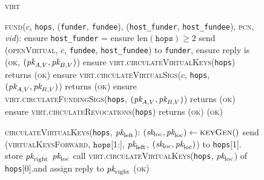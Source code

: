\begin{figure}[H]
  \begin{processbox}{\textsc{virt}}
    \begin{algorithmic}[1]
      \State \textsc{fund}($c$, \texttt{hops}, (\texttt{funder},
      \texttt{fundee}), (\texttt{host\_funder}, \texttt{host\_fundee}),
      \textsc{pcn}, \textit{vid}):
      \Indent
        \State ensure \texttt{host\_funder} = \alice{} 
        \State ensure $\mathrm{len}(\texttt{hops}) \geq 2$ 
        \State send (\textsc{openVirtual}, $c$, \texttt{fundee},
        \texttt{host\_fundee}) to \texttt{funder}, ensure reply is (\textsc{ok},
        $(\textit{pk}_{A, V}, \textit{pk}_{B, V})$)
        \State ensure \textsc{virt.circulateVirtualKeys}(\texttt{hops}) returns
        (\textsc{ok})
        \State ensure \textsc{virt.circulateVirtualSigs}($c$, \texttt{hops},
        $(\textit{pk}_{A, V}, \textit{pk}_{B, V})$) returns (\textsc{ok})
        \State ensure \textsc{virt.circulateFundingSigs}(\texttt{hops},
        $(\textit{pk}_{A, V}, \textit{pk}_{B, V})$) returns (\textsc{ok})
        \State ensure \textsc{virt.circulateRevocations}(\texttt{hops}) returns
        (\textsc{ok})
        \State \Return (\textsc{ok})
      \EndIndent
      \Statex

      \State \textsc{circulateVirtualKeys}(\texttt{hops},
      $\textit{pk}_{\mathrm{left}}$):
      \Indent
        \State {}
        \State $(\textit{sk}_{\mathrm{loc}}, \textit{pk}_{\mathrm{loc}}) \gets
        \textsc{keyGen}()$
         
           
            \State send (\textsc{virtualKeysForward}, $\texttt{hops}$[1:],
            $\textit{pk}_{\mathrm{left}}$, $(\textit{sk}_{\mathrm{loc}},
            \textit{pk}_{\mathrm{loc}})$) to \texttt{hops}[1].\alice{}
            \State {}
            \State {}
            \State {}
            \State store $\textit{pk}_{\mathrm{right}}$
          \EndIf
          \State \Return $\textit{pk}_{\mathrm{loc}}$
        \Else \: 
          \State call \textsc{virt.circulateVirtualKeys}(\texttt{hops},
          $\textit{pk}_{\mathrm{loc}}$) of \texttt{hops}[0].\bob and assign
          reply to $\textit{pk}_{\mathrm{right}}$
          \State \Return (\textsc{ok})
        \EndIf
      \EndIndent
    \end{algorithmic}
  \end{processbox}
  \caption{}
  \label{code:virtual-layer:keys}
\end{figure}

